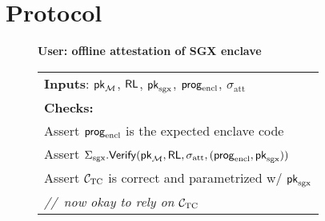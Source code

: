\newcommand{\pkM}{\ensuremath{{\sf pk}_{\mathcal{M}}}}
\newcommand{\pksgx}{\ensuremath{{\sf pk}_{\textrm{sgx}}}}
\newcommand{\rl}{\ensuremath{{\sf RL}}}
\newcommand{\enclaveprog}{\ensuremath{{\sf prog}_{\textrm{encl}}}}
\newcommand{\sigatt}{\ensuremath{\ensuremath{\sigma_{\textrm{att}}}}}
\newcommand{\sigsgx}{\ensuremath{\ensuremath{\Sigma_{\textrm{sgx}}}}}

\section{Protocol}


\begin{figure}
\begin{boxedminipage}{\columnwidth}
\begin{center}
{\bf User: offline attestation of SGX enclave}
\end{center}
\begin{tabular}{l}
{\bf Inputs}: $\pkM$, $\rl$, $\pksgx$, $\enclaveprog$, $\sigatt$ \\[5pt]
{\bf Checks:} \\
Assert $\enclaveprog$ is the expected enclave code\\
Assert $\sigsgx.{\sf Verify}(\pkM, \rl, \sigatt, (\enclaveprog, \pksgx))$ \\
Assert $\mathcal{C}_\mathrm{TC}$ is correct and parametrized w/ \pksgx\\
{\it //~now okay to rely on $\mathcal{C}_\mathrm{TC}$}
\end{tabular}
\end{boxedminipage}
\end{figure}






